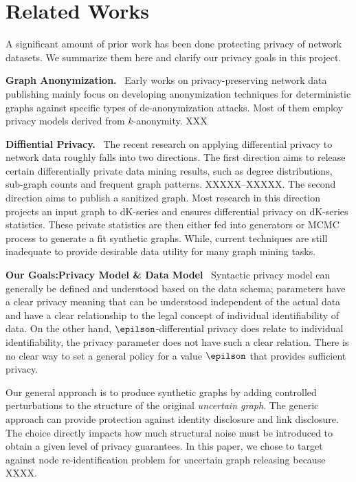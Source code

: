 \section{Related Works}
A significant amount of prior work has been done protecting privacy of network datasets.
We summarize them here and clarify our privacy goals in this project. 

\textbf{Graph Anonymization.}~ Early works on privacy-preserving network data publishing mainly focus on developing anonymization techniques for deterministic graphs against specific types of de-anonymization attacks. Most of them employ privacy models derived from $k$-anonymity. XXX 


\textbf{Diffiential Privacy.}~ The recent research on applying differential privacy to network data roughly falls into two directions. The first direction aims to release certain differentially private data mining results, such as degree distributions, sub-graph counts and frequent graph patterns. XXXXX--XXXXX. 
The second direction aims to publish a sanitized graph. Most research in this direction projects an input graph to dK-series and ensures differential privacy on dK-series statistics. These private statistics are then either fed into generators or MCMC process to generate a fit synthetic graphs. While, current techniques are still inadequate to provide desirable data utility for many graph mining tasks. 



\textbf{Our Goals:Privacy Model \& Data Model}~
Syntactic privacy model can generally be defined and understood based on the data schema; parameters have a clear privacy meaning that can be understood independent of the actual data and have a clear relationship to the legal concept of individual identifiability of data. On the other hand, $\epilson$-differential privacy does relate to individual identifiability, the privacy parameter does not have such a clear relation. There is no clear way to set a general policy for a value $\epilson$ that provides sufficient privacy. 

Our general approach is to produce synthetic graphs by adding controlled perturbations to the structure of the original \emph{uncertain graph}. The generic approach can provide protection against identity disclosure and link disclosure. The choice directly impacts how much structural noise must be introduced to obtain a given level of privacy guarantees. In this paper, we chose to target against node re-identification problem for {\emph uncertain graph} releasing because XXXX. 